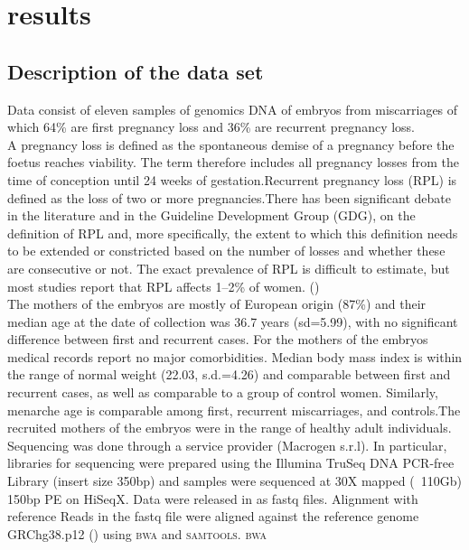 
\chapter{results}
\section{Description of the data set}
Data consist of eleven samples of genomics DNA of embryos from miscarriages of which 64\% are first pregnancy loss and 36\% are recurrent pregnancy loss.\\ 
A pregnancy loss is defined as the spontaneous demise of a pregnancy before the foetus reaches viability. The term therefore includes all pregnancy losses from the time of conception until 24 weeks of gestation.Recurrent pregnancy loss (RPL) is defined as the loss of two or more pregnancies.There has been significant debate in the literature and in the Guideline Development Group (GDG), on the definition of RPL and, more specifically, the extent to which this definition needs to be extended or constricted based on the number of losses and whether these are consecutive or not.
The exact prevalence of RPL is difficult to estimate, but most studies report that RPL affects 1–2\% of women. (\cite{eshre2018eshre})\\
The mothers of the embryos are mostly of European origin (87\%) and their median age at the date of collection was 36.7 years (sd=5.99), with no significant difference between first and recurrent cases. For the mothers of the embryos medical records report no major comorbidities. Median body mass index is within the range of normal weight (22.03, s.d.=4.26) and comparable between first and recurrent cases, as well as comparable to a group of control women. Similarly, menarche age is comparable among first, recurrent miscarriages, and controls.The recruited mothers of the embryos were in the range of healthy adult individuals.  \\
Sequencing was done through a service provider (Macrogen s.r.l). In particular, libraries for sequencing were prepared using the Illumina TruSeq DNA PCR-free Library (insert size 350bp) and samples were sequenced at 30X mapped (~110Gb) 150bp PE on HiSeqX. Data were released in as fastq files. 
Alignment with reference Reads in the fastq file were aligned against the reference genome GRChg38.p12 (\cite{rosenbloom2015ucsc}) using \textsc{bwa} and \textsc{samtools}. \textsc{bwa}

